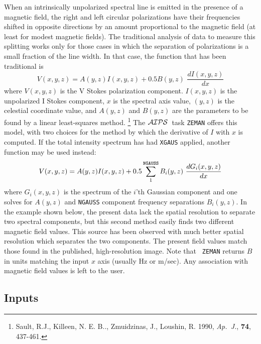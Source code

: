 \documentclass[twoside]{article}
\newcommand{\AIPS}{{$\cal AIPS\/$}}
\begin{document}
When an intrinsically unpolarized spectral line is emitted in the
presence of a magnetic field, the right and left circular
polarizations have their frequencies shifted in opposite directions by
an amount proportional to the magnetic field (at least for modest
magnetic fields).  The traditional analysis of data to measure this
splitting works only for those cases in which the separation of
polarizations is a small fraction of the line width.  In that case,
the function that has been traditional is
\begin{equation}
     V(x,y,z) = A(y,z) I(x,y,z) + 0.5 B(y,z)\,\, \frac{dI(x,y,z)}{dx}
\label{eqn:Zeman}
\end{equation}
where $V(x,y,z)$ is the V Stokes polarization component. $I(x,y,z)$ is
the unpolarized I Stokes component, $x$ is the spectral axis value,
$(y,z)$ is the celestial coordinate value, and $A(y,z)$ and $B(y,z)$
are the parameters to be found by a linear least-squares method.
\footnote{Sault, R.J., Killeen, N. E. B.., Zmuidzinas, J., Loushin, R.
  1990, {\it Ap.~J.}, {\bf 74}, 437-461.}  The \AIPS\ task {\tt ZEMAN}
offers this model, with two choices for the method by which the
derivative of $I$ with $x$ is computed.  If the total intensity
spectrum has had {\tt XGAUS} applied, another function may be used
instead:
\begin{equation}
     V(x,y,z) = A(y,z) I(x,y,z) + 0.5 \sum_1^{\tt NGAUSS} B_i(y,z)\,
        \,\frac{dG_i(x,y,z)}{dx}
\label{eqn:ZemanGaus}
\end{equation}
where $G_i(x,y,z)$ is the spectrum of the $i$'th Gaussian component
and one solves for $A(y,z)$ and {\tt NGAUSS} component frequency
separations $B_i(y,z)$.  In the example shown below, the present data
lack the spatial resolution to separate two spectral components, but
this second method easily finds two different magnetic field values.
This source has been observed with much better spatial resolution
which separates the two components.  The present field values match
those found in the published, high-resolution image.  Note that {\tt
  ZEMAN} returns $B$ in units matching the input $x$ axis (usually Hz
or m/sec).  Any association with magnetic field values is left to the
user.

\subsection{Inputs}
\end{document}

